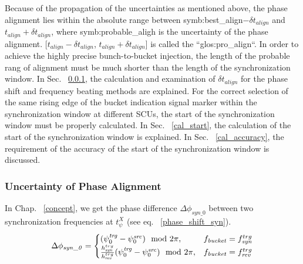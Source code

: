 Because of the propagation of the uncertainties as mentioned above, the phase alignment lies within the absolute range between \gls{symb:best_align}$-\delta t_\mathit{align}$ and $t_\mathit{align}+\delta t_\mathit{align}$, where \gls{symb:probable_aligh} is the uncertainty of the phase alignment. [$t_\mathit{align}-\delta t_\mathit{align}$, $t_\mathit{align}+\delta t_\mathit{align}$] is called the ``\gls{glos:pro_align}``. In order to achieve the highly precise bunch-to-bucket injection, the length of the probable rang of alignment must be much shorter than the length of the synchronization window. In Sec. ~\ref{cal_align}, the calculation and examination of $\delta t_\mathit{align}$ for the phase shift and frequency beating methods are explained. For the correct selection of the same rising edge of the bucket indication signal marker within the synchronization window at different SCUs, the start of the synchronization window must be properly calculated. In Sec.  ~\ref{cal_start}, the calculation of the start of the synchronization window is explained. In Sec.  ~\ref{cal_accuracy}, the requirement of the accuracy of the start of the synchronization window is discussed. 

\subsubsection{Uncertainty of Phase Alignment}
\label{cal_align}
In Chap. ~\ref{concept}, we get the phase difference $\Delta \phi_\mathit{syn\_0}$ between two synchronization frequencies at $t_\psi^X$ (see eq. ~\ref{phase_shift_syn}).
\begin{eqnarray}\label{phase_syn}
\Delta \phi_\mathit{syn\_0}=
\begin{cases}
(\psi^\mathit{trg}_0-\psi^\mathit{src}_0) \mod 2\pi, &f_{\mathit{bucket}}=f_{\mathit{syn}}^{trg}\cr
\frac{h_{\mathit{syn}}^{trg}}{h_{\mathit{rev}}^{trg}}(\psi^\mathit{trg}_0-\psi^\mathit{src}_0) \mod 2\pi, &f_{\mathit{bucket}}=f_{\mathit{rev}}^{trg}\cr
\end{cases}
\end{eqnarray}

